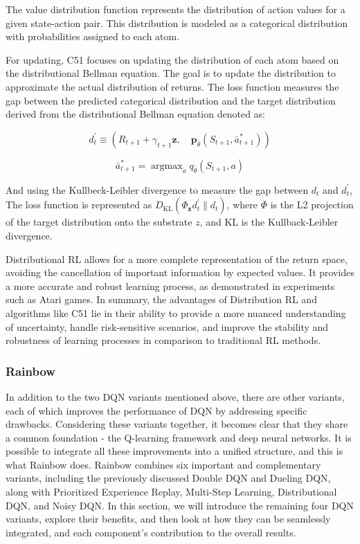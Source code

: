 \documentclass{article}
\begin{document}
The value distribution function represents the distribution of action values for a given state-action pair. This distribution is modeled as a categorical distribution with probabilities assigned to each atom.

For updating, C51 focuses on updating the distribution of each atom based on the distributional Bellman equation. The goal is to update the distribution to approximate the actual distribution of returns. The loss function measures the gap between the predicted categorical distribution and the target distribution derived from the distributional Bellman equation denoted as:


\begin{equation}
d_t^{\prime} \equiv\left(R_{t+1}+\gamma_{t+1} \boldsymbol{z}, \quad \boldsymbol{p}_{\bar{\theta}}\left(S_{t+1}, \bar{a}_{t+1}^*\right)\right)
\end{equation}

\begin{equation}
\bar{a}_{t+1}^*=\operatorname{argmax}_a q_{\bar{\theta}}\left(S_{t+1}, a\right)
\end{equation}

\hspace*{\fill}

And using the Kullbeck-Leibler divergence to measure the gap between $d_t$ and $d^{\prime}_t$, The loss function is represented as $D_{\mathrm{KL}}\left(\Phi_{\boldsymbol{z}} d_t^{\prime} \| d_t\right) $, where $\Phi$ is the L2 projection of the target distribution onto the substrate $z$, and KL is the Kullback-Leibler divergence.


Distributional RL allows for a more complete representation of the return space, avoiding the cancellation of important information by expected values. It provides a more accurate and robust learning process, as demonstrated in experiments such as Atari games. In summary, the advantages of Distribution RL and algorithms like C51 lie in their ability to provide a more nuanced understanding of uncertainty, handle risk-sensitive scenarios, and improve the stability and robustness of learning processes in comparison to traditional RL methods.


\newpage
\subsubsection{Rainbow}

In addition to the two DQN variants mentioned above, there are other variants, each of which improves the performance of DQN by addressing specific drawbacks. Considering these variants together, it becomes clear that they share a common foundation - the Q-learning framework and deep neural networks. It is possible to integrate all these improvements into a unified structure, and this is what Rainbow does. Rainbow combines six important and complementary variants, including the previously discussed Double DQN and Dueling DQN, along with Prioritized Experience Replay, Multi-Step Learning, Distributional DQN, and Noisy DQN. In this section, we will introduce the remaining four DQN variants, explore their benefits, and then look at how they can be seamlessly integrated, and each component's contribution to the overall results.
\end{document}
